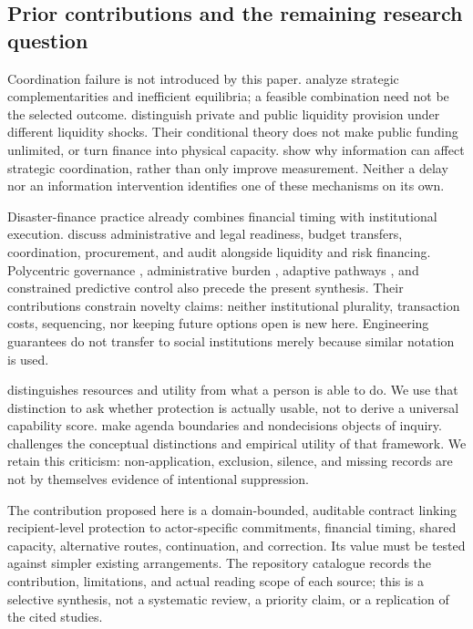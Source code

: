 \documentclass[11pt,a4paper]{article}
\numberwithin{equation}{section}
\theoremstyle{definition}
\theoremstyle{plain}
\theoremstyle{remark}
\begin{document}
\subsection{Prior contributions and the remaining research question}
\label{sec:priorwork}

Coordination failure is not introduced by this paper. \citet{cooperjohn1988} analyze strategic complementarities and inefficient equilibria; a feasible combination need not be the selected outcome. \citet{holmstromtirole1998} distinguish private and public liquidity provision under different liquidity shocks. Their conditional theory does not make public funding unlimited, or turn finance into physical capacity. \citet{morrisshin2002} show why information can affect strategic coordination, rather than only improve measurement. Neither a delay nor an information intervention identifies one of these mechanisms on its own.

Disaster-finance practice already combines financial timing with institutional execution. \citet{ghesquieremahul2010} discuss administrative and legal readiness, budget transfers, coordination, procurement, and audit alongside liquidity and risk financing. Polycentric governance \citep{ostrom2010}, administrative burden \citep{moynihan2015}, adaptive pathways \citep{haasnoot2013}, and constrained predictive control \citep{mayne2000} also precede the present synthesis. Their contributions constrain novelty claims: neither institutional plurality, transaction costs, sequencing, nor keeping future options open is new here. Engineering guarantees do not transfer to social institutions merely because similar notation is used.

\citet{sen1980} distinguishes resources and utility from what a person is able to do. We use that distinction to ask whether protection is actually usable, not to derive a universal capability score. \citet{bachrachbaratz1962,bachrachbaratz1963} make agenda boundaries and nondecisions objects of inquiry. \citet{debnam1975} challenges the conceptual distinctions and empirical utility of that framework. We retain this criticism: non-application, exclusion, silence, and missing records are not by themselves evidence of intentional suppression.

The contribution proposed here is a domain-bounded, auditable contract linking recipient-level protection to actor-specific commitments, financial timing, shared capacity, alternative routes, continuation, and correction. Its value must be tested against simpler existing arrangements. The repository catalogue records the contribution, limitations, and actual reading scope of each source; this is a selective synthesis, not a systematic review, a priority claim, or a replication of the cited studies.
\end{document}
